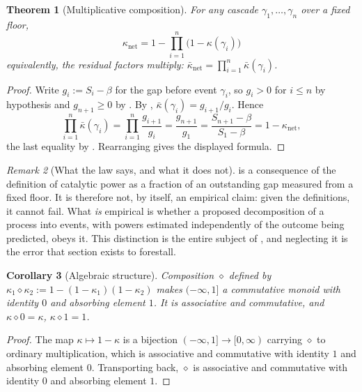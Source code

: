 \documentclass[11pt,a4paper]{article}
\theoremstyle{thmstyle}
\newtheorem{theorem}{Theorem}[section]
\newtheorem{corollary}[theorem]{Corollary}
\theoremstyle{definition}
\theoremstyle{remark}
\newtheorem{remark}[theorem]{Remark}
\newcommand{\flo}{\beta}
\newcommand{\kap}{\kappa}
\newcommand{\comp}{\diamond}
\begin{document}
\begin{theorem}[Multiplicative composition]
\label{thm:composition}
For any cascade $\gamma_1,\dots,\gamma_n$ over a fixed floor,
\[
\boxed{\ \kap_{\mathrm{net}}
=1-\prod_{i=1}^{n}\bigl(1-\kap(\gamma_i)\bigr)\ }
\]
equivalently, the residual factors multiply:
$\bar\kap_{\mathrm{net}}=\prod_{i=1}^{n}\bar\kap(\gamma_i)$.
\end{theorem}

\begin{proof}
Write $g_i:=S_i-\flo$ for the gap before event $\gamma_i$, so $g_i>0$ for
$i\le n$ by hypothesis and $g_{n+1}\ge0$ by . By
, $\bar\kap(\gamma_i)=g_{i+1}/g_i$. Hence
\[
\prod_{i=1}^{n}\bar\kap(\gamma_i)
=\prod_{i=1}^{n}\frac{g_{i+1}}{g_i}
=\frac{g_{n+1}}{g_1}
=\frac{S_{n+1}-\flo}{S_1-\flo}
=1-\kap_{\mathrm{net}},
\]
the last equality by . Rearranging gives the displayed
formula.
\end{proof}

\begin{remark}[What the law says, and what it does not]
\label{rem:law-content}
 is a consequence of the definition of catalytic power
as a fraction of an outstanding gap measured from a fixed floor. It is
therefore not, by itself, an empirical claim: given the definitions, it
cannot fail. What \emph{is} empirical is whether a proposed decomposition of
a process into events, with powers estimated independently of the outcome
being predicted, obeys it. This distinction is the entire subject of
, and neglecting it is the error that section exists
to forestall.
\end{remark}

\begin{corollary}[Algebraic structure]
\label{cor:structure}
Composition $\comp$ defined by
$\kap_1\comp\kap_2:=1-(1-\kap_1)(1-\kap_2)$ makes $(-\infty,1]$ a
commutative monoid with identity $0$ and absorbing element $1$. It is
associative and commutative, and $\kap\comp0=\kap$, $\kap\comp1=1$.
\end{corollary}

\begin{proof}
The map $\kap\mapsto1-\kap$ is a bijection $(-\infty,1]\to[0,\infty)$
carrying $\comp$ to ordinary multiplication, which is associative and
commutative with identity $1$ and absorbing element $0$. Transporting back,
$\comp$ is associative and commutative with identity $0$ and absorbing
element $1$.
\end{proof}
\end{document}
